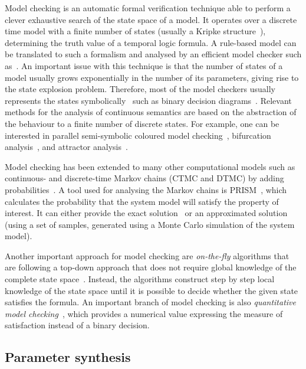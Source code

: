 \documentclass[11pt,a4paper]{report}
\begin{document}
Model checking is an automatic formal verification technique able to perform a clever exhaustive search of the state space of a model. It operates over a discrete time model with a finite number of states (usually a Kripke structure~\cite{kripke1963semantical}), determining the truth value of a temporal logic formula. A rule-based model can be translated to such a formalism and analysed by an efficient model checker such as~\cite{cimatti2002nusmv}. An important issue with this technique is that the number of states of a model usually grows exponentially in the number of its parameters, giving rise to the state explosion problem. Therefore, most of the model checkers usually represents the states symbolically~\cite{burch1992symbolic} such as binary decision diagrams~\cite{bryant2001graph}. Relevant methods for the analysis of continuous semantics are based on the abstraction of the behaviour to a finite number of discrete states. For example, one can be interested in parallel semi-symbolic coloured model checking~\cite{benevs2016model}, bifurcation analysis~\cite{benevs2017discrete}, and attractor analysis~\cite{benevs2018fully}.

Model checking has been extended to many other computational models such as continuous- and discrete-time Markov chains (CTMC and DTMC) by adding probabilities~\cite{kwiatkowska2010probabilistic}. A tool used for analysing the Markov chains is PRISM~\cite{kwiatkowska2011prism}, which calculates the probability that the system model will satisfy the property of interest. It can either provide the exact solution~\cite{aziz2000model} or an approximated solution~\cite{jha2009bayesian} (using a set of samples, generated using a Monte Carlo simulation of the system model). 

Another important approach for model checking are \emph{on-the-fly} algorithms that are following a top-down approach that does not require global knowledge of the complete state space~\cite{latella2014fly,bhat1995efficient,courcoubetis1992memory,gnesi2011abstract,holzmann2004spin}. Instead, the algorithms construct step by step local knowledge of the state space until it is possible to decide whether the given state satisfies the formula. An important branch of model checking is also \emph{quantitative model checking}~\cite{huth1997quantitative}, which provides a numerical value expressing the measure of satisfaction instead of a binary decision.

\subsection{Parameter synthesis}
\end{document}

